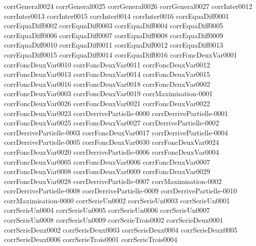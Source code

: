 {corrGeneral0024}
{corrGeneral0025}
{corrGeneral0026}
{corrGeneral0027}
{corrInter0012}
{corrInter0013}
{corrInter0015}
{corrInter0014}
{corrInter0016}
{corrEquaDiff0001}
{corrEquaDiff0002}
{corrEquaDiff0003}
{corrEquaDiff0004}
{corrEquaDiff0005}
{corrEquaDiff0006}
{corrEquaDiff0007}
{corrEquaDiff0008}
{corrEquaDiff0009}
{corrEquaDiff0010}
{corrEquaDiff0011}
{corrEquaDiff0012}
{corrEquaDiff0013}
{corrEquaDiff0015}
{corrEquaDiff0014}
{corrEquaDiff0016}
{corrFoncDeuxVar0001}
{corrFoncDeuxVar0010}
{corrFoncDeuxVar0011}
{corrFoncDeuxVar0012}
{corrFoncDeuxVar0013}
{corrFoncDeuxVar0014}
{corrFoncDeuxVar0015}
{corrFoncDeuxVar0016}
{corrFoncDeuxVar0018}
{corrFoncDeuxVar0002}
{corrFoncDeuxVar0003}
{corrFoncDeuxVar0019}
{corrMaximisation-0001}
{corrFoncDeuxVar0026}
{corrFoncDeuxVar0021}
{corrFoncDeuxVar0022}
{corrFoncDeuxVar0023}
{corrDerrivePartielle-0000}
{corrDerrivePartielle-0001}
{corrFoncDeuxVar0025}
{corrFoncDeuxVar0027}
{corrDerrivePartielle-0002}
{corrDerrivePartielle-0003}
{corrFoncDeuxVar0017}
{corrDerrivePartielle-0004}
{corrDerrivePartielle-0005}
{corrFoncDeuxVar0030}
{corrFoncDeuxVar0024}
{corrFoncDeuxVar0020}
{corrDerrivePartielle-0006}
{corrFoncDeuxVar0004}
{corrFoncDeuxVar0005}
{corrFoncDeuxVar0006}
{corrFoncDeuxVar0007}
{corrFoncDeuxVar0008}
{corrFoncDeuxVar0009}
{corrFoncDeuxVar0029}
{corrFoncDeuxVar0028}
{corrDerrivePartielle-0007}
{corrMaximisation-0002}
{corrDerrivePartielle-0008}
{corrDerrivePartielle-0009}
{corrDerrivePartielle-0010}
{corrMaximisation-0000}
{corrSerieUn0002}
{corrSerieUn0003}
{corrSerieUn0001}
{corrSerieUn0004}
{corrSerieUn0005}
{corrSerieUn0006}
{corrSerieUn0007}
{corrSerieUn0008}
{corrSerieUn0009}
{corrSerieTrois0002}
{corrSerieDeux0001}
{corrSerieDeux0002}
{corrSerieDeux0003}
{corrSerieDeux0004}
{corrSerieDeux0005}
{corrSerieDeux0006}
{corrSerieTrois0001}
{corrSerieTrois0004}
